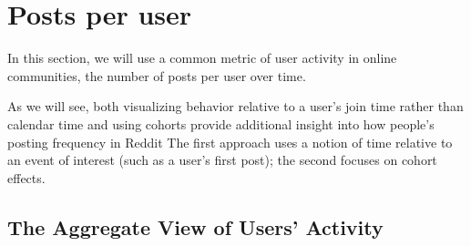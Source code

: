 \section{Posts per user}

In this section, we will use a common metric of user activity in online communities, the number of posts per user over time. 

As we will see, both visualizing behavior relative to a user's join time rather than calendar time and using cohorts provide additional insight into how people's posting frequency in Reddit 
The first approach uses a notion of time relative to an event of interest (such as a user's first post); the second focuses on cohort effects.

\subsection{The Aggregate View of Users' Activity}


